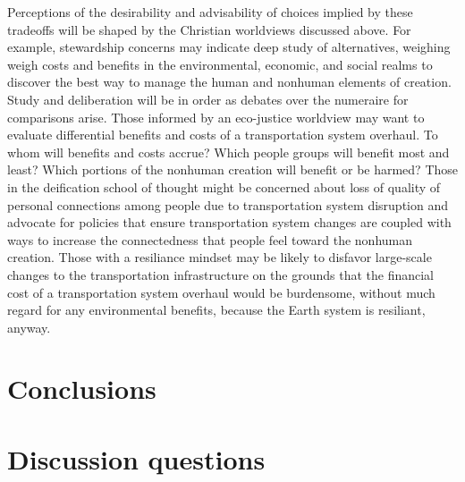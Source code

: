 \documentclass[12pt]{article}
\begin{document}
Perceptions of the desirability and advisability of choices implied by these tradeoffs 
will be shaped by the Christian worldviews discussed above.
For example, stewardship concerns may indicate deep study of alternatives, 
weighing weigh costs and benefits in the environmental, economic, and social realms
to discover the best way to manage the human and nonhuman elements of creation.
Study and deliberation will be in order as debates over the numeraire for comparisons arise.
Those informed by an eco-justice worldview may want to evaluate 
differential benefits and costs of a transportation system overhaul.
To whom will benefits and costs accrue? 
Which people groups will benefit most and least? 
Which portions of the nonhuman creation will benefit or be harmed? 
Those in the deification school of thought might be concerned 
about loss of quality of personal connections 
among people due to transportation system disruption
and advocate for policies that ensure transportation system changes 
are coupled with ways to increase the connectedness that people
feel toward the nonhuman creation.
Those with a resiliance mindset may be likely to disfavor 
large-scale changes to the transportation infrastructure 
on the grounds that the financial cost of a transportation system overhaul would be burdensome,
without much regard for any environmental benefits, 
because the Earth system is resiliant, anyway.







\section{Conclusions}
\label{sec:conclusions}


\appendix

\section{Discussion questions}
\label{sec:discussion_questions}
\end{document}
